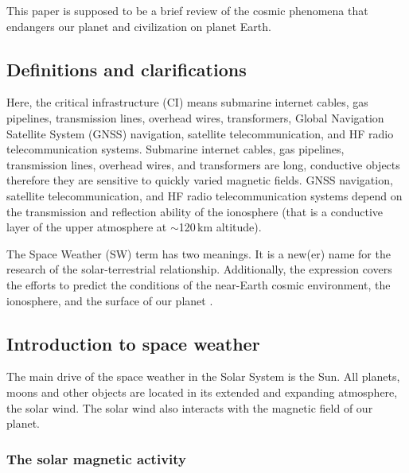 \documentclass[sn-aps]{sn-jnl}%
\begin{document}
This paper is supposed to be a brief review of the cosmic phenomena that endangers our planet and civilization on planet Earth. 

\subsection{Definitions and clarifications}
\label{sec:def}

Here, the critical infrastructure (CI) means submarine internet cables, gas pipelines, transmission lines, overhead wires, transformers, Global Navigation Satellite System (GNSS) navigation, satellite telecommunication, and HF radio telecommunication systems. Submarine internet cables, gas pipelines, transmission lines, overhead wires, and transformers are long, conductive objects therefore they are sensitive to quickly varied magnetic fields. GNSS navigation, satellite telecommunication, and HF radio telecommunication systems depend on the transmission and reflection ability of the ionosphere (that is a conductive layer of the upper atmosphere at $\sim$120\,km altitude).

The Space Weather (SW) term has two meanings. It is a new(er) name for the research of the solar-terrestrial relationship. Additionally, the expression covers the efforts to predict the conditions of the near-Earth cosmic environment, the ionosphere, and the surface of our planet \cite{scherer05:_space_weath}. 


\subsection{Introduction to space weather}
\label{sec:swintro}

The main drive of the space weather in the Solar System is the Sun. All planets, moons and other objects are located in its extended and expanding atmosphere, the solar wind. The solar wind also interacts with the magnetic field of our planet.

\subsubsection{The solar magnetic activity}
\label{sec:magnact}
\end{document}
